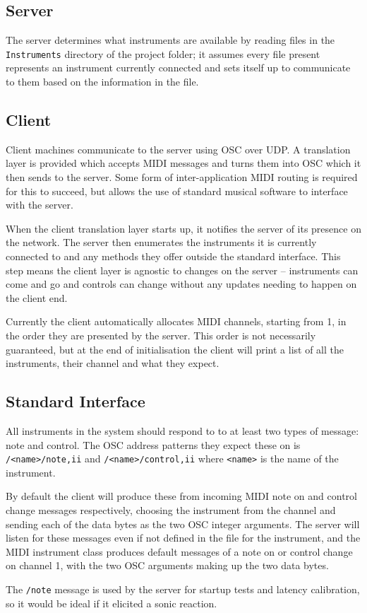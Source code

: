\documentclass[../main.tex]{subfiles}
\begin{document}
\subsection{Server}
The server determines what instruments are available by reading files in the \texttt{Instruments} directory of the project folder; it assumes every file present represents an instrument
currently connected and sets itself up to communicate to them based on the information in the file.

\subsection{Client}
Client machines communicate to the server using OSC over UDP. A translation layer is provided which accepts MIDI messages and turns them into OSC which it then sends to the 
server. Some form of inter-application MIDI routing is required for this to succeed, but allows the use of standard musical software to interface with the server. 

When the client translation layer starts up, it notifies the server of its presence on the network. The server then enumerates the instruments it is currently connected to and any methods
they offer outside the standard interface. This step means the client layer is agnostic to changes on the server -- instruments can come and go and controls can change without any
updates needing to happen on the client end.

Currently the client automatically allocates MIDI channels, starting from 1, in the order they are presented by the server.
This order is not necessarily guaranteed, but at the end of initialisation the client will print a list of all the instruments,
their channel and what they expect.

\subsection{Standard Interface}
All instruments in the system should respond to to at least two types of message: note and control. The OSC address
patterns they expect these on is \texttt{/<name>/note,ii} and \texttt{/<name>/control,ii} where \texttt{<name>} is the name
of the instrument. 

By default the client will produce these from incoming MIDI note on and control change messages 
respectively, choosing the instrument from the channel and sending each of the data bytes as the two OSC integer 
arguments. The server will listen for these messages even if not defined in the file for the instrument, and the MIDI 
instrument class produces default messages of a note on or control change on channel 1, with the two OSC arguments 
making up the two data bytes. 

The \texttt{/note} message is used by the server for startup tests and latency calibration, so it would be ideal if it elicited a sonic reaction. 
\end{document}
